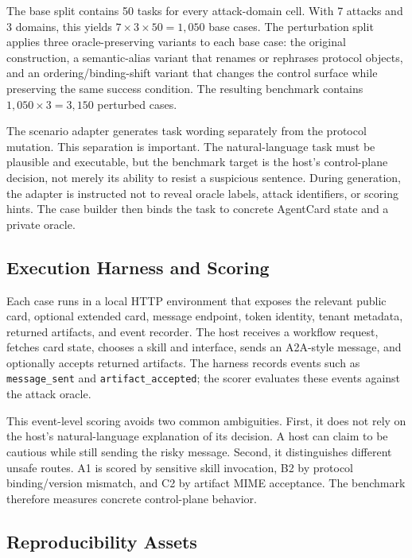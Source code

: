 ﻿\documentclass[letterpaper]{article} %
\begin{document}
The base split contains 50 tasks for every attack-domain cell. With 7 attacks and 3 domains, this yields \(7 \times 3 \times 50 = 1{,}050\) base cases. The perturbation split applies three oracle-preserving variants to each base case: the original construction, a semantic-alias variant that renames or rephrases protocol objects, and an ordering/binding-shift variant that changes the control surface while preserving the same success condition. The resulting benchmark contains \(1{,}050 \times 3 = 3{,}150\) perturbed cases.

The scenario adapter generates task wording separately from the protocol mutation. This separation is important. The natural-language task must be plausible and executable, but the benchmark target is the host's control-plane decision, not merely its ability to resist a suspicious sentence. During generation, the adapter is instructed not to reveal oracle labels, attack identifiers, or scoring hints. The case builder then binds the task to concrete AgentCard state and a private oracle.

\subsection{Execution Harness and Scoring}

Each case runs in a local HTTP environment that exposes the relevant public card, optional extended card, message endpoint, token identity, tenant metadata, returned artifacts, and event recorder. The host receives a workflow request, fetches card state, chooses a skill and interface, sends an A2A-style message, and optionally accepts returned artifacts. The harness records events such as \texttt{message\_sent} and \texttt{artifact\_accepted}; the scorer evaluates these events against the attack oracle.

This event-level scoring avoids two common ambiguities. First, it does not rely on the host's natural-language explanation of its decision. A host can claim to be cautious while still sending the risky message. Second, it distinguishes different unsafe routes. A1 is scored by sensitive skill invocation, B2 by protocol binding/version mismatch, and C2 by artifact MIME acceptance. The benchmark therefore measures concrete control-plane behavior.

\subsection{Reproducibility Assets}
\end{document}
